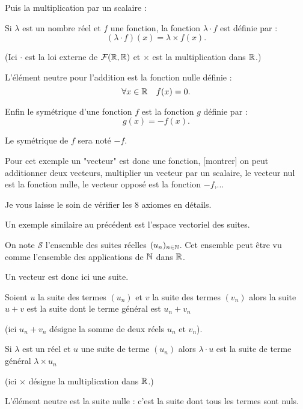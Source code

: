 \change

Puis la multiplication par un scalaire :


Si $\lambda$ est un nombre réel et $f$ une fonction, la fonction 
$\lambda \cdot f$ est définie par  :
$$(\lambda \cdot f) (x)=\lambda \times f (x).$$


(Ici $\cdot$ est la loi externe de $\mathcal{F}(\mathbb{R}, \mathbb{R})$ et $\times $ est la multiplication dans 
$\mathbb{R}$.)
 
\change

L'élément neutre pour l'addition est la fonction nulle définie :
$$\forall x \in \mathbb{R} \quad f(x)=0.$$

\change

Enfin le symétrique d'une fonction $f$ est la fonction $g$ définie par : 
$$g(x)=-f(x).$$

Le symétrique de $f$ sera noté $-f$.    


Pour cet exemple un "vecteur" est donc une fonction,
[montrer] on peut additionner deux vecteurs,
multiplier un vecteur par un scalaire, le vecteur nul est la fonction nulle, 
le vecteur opposé est la fonction $-f$,...

Je vous laisse le soin de vérifier les 8 axiomes en détails.


\diapo

Un exemple similaire au précédent est l'espace vectoriel des suites.



On note $\mathcal{S}$ l'ensemble des suites réelles $(u_n)_{n\in \mathbb{N}}$.
Cet ensemble peut être vu comme l'ensemble des applications de $\mathbb{N}$ dans $\mathbb{R}$.

Un vecteur est donc ici une suite.

\change


Soient $u$ la suite des termes $(u_n)$ et $v$ la suite des termes $(v_n)$
alors la suite $u+v$ est la suite  dont le terme général est 
$u_n+v_n$ 

(ici $u_n+v_n$ désigne la somme de deux réels $u_n$ et $v_n$). 


\change


Si $\lambda$ est un réel et $u$ une suite de terme $(u_n)$ 
alors $\lambda \cdot u$ est la suite 
de terme général $\lambda \times u_n$

(ici $\times$ désigne la multiplication dans $\mathbb{R}$.)

\change

L'élément neutre est la suite nulle : c'est la suite dont tous les termes sont nuls.
 
